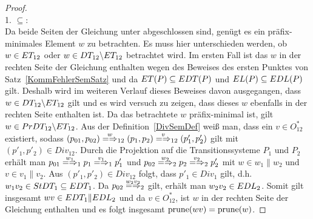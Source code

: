 \begin{proof}\mbox{}\\
  1. \glqq$\subseteq$\grqq{}:\\
  Da beide Seiten der Gleichung unter \cont{} abgeschlossen sind, genügt es ein
  präfix-minimales Element $w$ zu betrachten. Es muss hier unterschieden
  werden, ob $w\in ET _{12}$ oder $w\in DT _{12}\backslash ET _{12}$ betrachtet
  wird. Im ersten Fall ist das $w$ in der rechten Seite der Gleichung enthalten
  wegen des Beweises des ersten Punktes von Satz~\ref{KommFehlerSemSatz} und da
  $ET (P)\subseteq EDT (P)$ und $EL (P)\subseteq EDL (P)$ gilt. Deshalb
  wird im weiteren Verlauf dieses Beweises davon ausgegangen, dass $w\in DT
  _{12}\backslash ET _{12}$ gilt und es wird versuch zu zeigen, dass dieses $w$
  ebenfalls in der rechten Seite enthalten ist. Da das betrachtete $w$
  präfix-minimal ist, gilt $w\in PrDT _{12}\backslash ET _{12}$. Aus der
  Definition~\ref{DivSemDef} weiß man, dass ein $v\in O^*_{12}$ existiert,
  sodass $(p_{01},p_{02})\weakmay[w]_{12} (p_1,p_2)\weakmay[v]_{12}
  (p'_1,p'_2)$ gilt mit $(p'_1,p'_2)\in Div _{12}$. Durch die Projektion auf die
  Transitionssysteme $P_1$ und $P_2$ erhält man $p_{01}\weakmay[w_1]_1 p_1
  \weakmay[v_1]_1 p'_1$ und $p_{02}\weakmay[w_2]_2 p_2\weakmay[v_2]_2 p'_2$ mit
  $w\in w_1\|w_2$ und $v\in v_1\|v_2$. Aus $(p'_1,p'_2)\in Div _{12}$ folgt,
  dass \oBdA{} $p'_1\in Div _1$ gilt, d.h.\ $w_1v_2\in StDT _1\subseteq EDT
  _1$. Da $p_{02}\weakmay[w_2v_2]_2$ gilt, erhält man $w_2v_2\in EDL _2$. Somit
  gilt insgesamt $wv\in EDT _1\|EDL _2$ und da $v\in O^*_{12}$, ist $w$ in der
  rechten Seite der Gleichung enthalten und es folgt insgesamt $\mathrm{prune} (wv) =
  \mathrm{prune} (w)$.


\end{proof}
